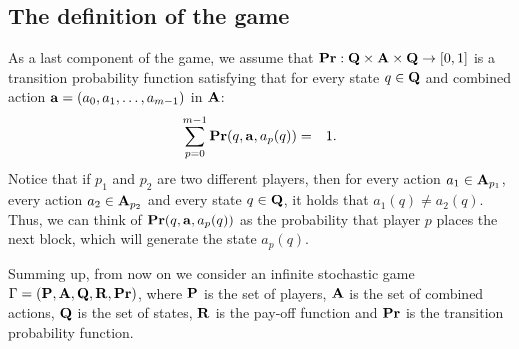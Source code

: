  
\subsection{The definition of the game}
As a last component of the game, we assume that $\mathbf{Pr} : \mathbf{Q} \times \mathbf{A} \times \mathbf{Q} \to [0,1]$ is a transition probability function satisfying that for every state $q \in \mathbf{Q}$ and combined action $\mathbf{a} = (a_0, a_1, \ldots, a_{m-1})$ in $\mathbf{A}$:
\begin{eqnarray*}\label{eq-prop}
\sum_{p=0}^{m-1} \mathbf{Pr}(q, \mathbf{a}, a_p(q)) & = & 1.
\end{eqnarray*}
Notice that if $p_1$ and $p_2$ are two different players, then for every action $a_1 \in \mathbf{A}_{p_1}$, every action $a_2 \in \mathbf{A}_{p_2}$ and every state $q \in \mathbf{Q}$, it holds that $a_1(q) \neq a_2(q)$. Thus, we can think of $\mathbf{Pr}(q, \mathbf{a}, a_p(q))$ as the probability that player $p$ places the next block, which will generate the state $a_p(q)$. 

Summing up, from now on we consider an infinite stochastic game $\Gamma = (\mathbf{P},\mathbf{A},\mathbf{Q},\mathbf{R},\mathbf{Pr})$, where $\mathbf{P}$ is the set of players, $\mathbf{A}$ is the set of combined actions, $\mathbf{Q}$ is the set of states, $\mathbf{R}$ is the pay-off function and $\mathbf{Pr}$ is the transition probability function.

